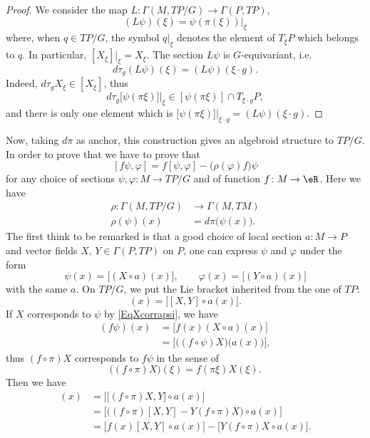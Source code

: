 \begin{proof}
 We consider the map $L\colon \Gamma(M,TP/G)\to \Gamma(P,TP)$, 
\[ 
  (L\psi)(\xi)=\psi(\pi(\xi))|_{\xi}
\]
where, when $q\in TP/G$, the symbol $q|_{\xi}$ denotes the element of $T_{\xi} P$ which belongs to $q$. In particular, $[X_{\xi}]|_{\xi}=X_{\xi}$. The section $L\psi$ is $G$-equivariant, i.e.
\begin{equation}
 d\tau_{g}(L\psi)(\xi)=(L\psi)(\xi\cdot g).
\end{equation}
Indeed, $d\tau_{g}X_{\xi}\in [X_{\xi}]$, thus
\[ 
  d\tau_{g}\big[ \psi(\pi\xi) \big]|_{\xi}\in [\psi(\pi\xi)]\cap T_{\xi\cdot g}P,
\]
and there is only one element which is $\big[ \psi(\pi\xi) \big]|_{\xi\cdot g}=(L\psi)(\xi\cdot g)$.
\end{proof}

Now, taking $d\pi$ as anchor, this construction gives an algebroid structure to $TP/G$. In order to prove that we have to prove that 
\[ 
  [f\psi,\varphi]=f[\psi,\varphi]-\big( \rho(\varphi)f \big)\psi
\]
for any choice of sections $\psi,\varphi\colon M\to TP/G$ and of function $f\colon M\to \eR$. Here we have
\begin{equation}
\begin{aligned}
 \rho\colon \Gamma(M,TP/G)&\to \Gamma(M,TM) \\ 
\rho(\psi)(x)& =d\pi\big( \psi(x) \big). 
\end{aligned}
\end{equation}
The first think to be remarked is that a good choice of local section $a\colon M\to P$ and vector fields $X$, $Y\in\Gamma(P,TP)$ on $P$, one can express $\psi$ and $\varphi$ under the form
\begin{equation}  \label{EqXcorrapsi}
\psi(x)=\big[ (X\circ a)(x) \big],\qquad \varphi(x)=\big[ (Y\circ a)(x) \big]
\end{equation}
with the same $a$. On $TP/G$, we put the Lie bracket inherited from the one of $TP$:
\begin{equation}
[\psi,\varphi](x)=\Big[ [X,Y]\circ a(x) \Big].
\end{equation}
If $X$ corresponds to $\psi$ by \eqref{EqXcorrapsi}, we have
\begin{align*}
  (f\psi)(x)&=\Big[ f(x)(X\circ a)(x) \Big]\\
		&=\Big[ \big( (f\circ\psi)X \big)\big( a(x) \big) \Big],
\end{align*}
thus $(f\circ \pi)X$ corresponds to $f\psi$ in the sense of
\[ 
  \Big( (f\circ \pi)X \Big)(\xi)=f(\pi\xi)X(\xi).
\]
Then we have
\begin{align*}
  [f\psi,\varphi](x)&=\Big[ \big[ (f\circ\pi)X,Y \big]\circ a(x) \Big]\\
		&=\Big[ \big( (f\circ\pi)[X,Y]-Y(f\circ\pi)X \big)\circ a(x) \Big]\\
		&=\big[ f(x)[X,Y]\circ a(x) \big]-\big[ Y(f\circ\pi)X\circ a(x) \big].
\end{align*}
